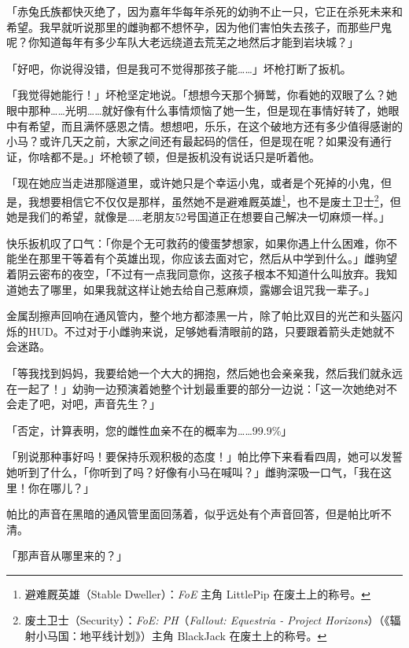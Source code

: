 「赤兔氏族都快灭绝了，因为嘉年华每年杀死的幼驹不止一只，它正在杀死未来和希望。我早就听说那里的雌驹都不想怀孕，因为他们害怕失去孩子，而那些尸鬼呢？你知道每年有多少车队大老远绕道去荒芜之地然后才能到岩块城？」

「好吧，你说得没错，但是我可不觉得那孩子能……」坏枪打断了扳机。

「我觉得她能行！」坏枪坚定地说。「想想今天那个狮鹫，你看她的双眼了么？她眼中那种……光明……就好像有什么事情烦恼了她一生，但是现在事情好转了，她眼中有希望，而且满怀感恩之情。想想吧，乐乐，在这个破地方还有多少值得感谢的小马？或许几天之前，大家之间还有最起码的信任，但是现在呢？如果没有通行证，你啥都不是。」坏枪顿了顿，但是扳机没有说话只是听着他。

「现在她应当走进那隧道里，或许她只是个幸运小鬼，或者是个死掉的小鬼，但是，我想要相信它不仅仅是那样，虽然她不是避难厩英雄\footnote{避难厩英雄（Stable Dweller）：\emph{FoE} 主角 LittlePip 在废土上的称号。}，也不是废土卫士\footnote{废土卫士（Security）：\emph{FoE: PH}（\emph{Fallout: Equestria - Project Horizons}）（《辐射小马国：地平线计划》）主角 BlackJack 在废土上的称号。}，但她是我们的希望，就像是……老朋友52号国道正在想要自己解决一切麻烦一样。」

快乐扳机叹了口气：「你是个无可救药的傻蛋梦想家，如果你遇上什么困难，你不能坐在那里干等着有个英雄出现，你应该去面对它，然后从中学到什么。」雌驹望着阴云密布的夜空，「不过有一点我同意你，这孩子根本不知道什么叫放弃。我知道她去了哪里，如果我就这样让她去给自己惹麻烦，露娜会诅咒我一辈子。」

\horizonline


金属刮擦声回响在通风管内，整个地方都漆黑一片，除了帕比双目的光芒和头盔闪烁的HUD。不过对于小雌驹来说，足够她看清眼前的路，只要跟着箭头走她就不会迷路。

「等我找到妈妈，我要给她一个大大的拥抱，然后她也会亲亲我，然后我们就永远在一起了！」幼驹一边预演着她整个计划最重要的部分一边说：「这一次她绝对不会走了吧，对吧，声音先生？」

「{\mtzh 否定，计算表明，您的雌性血亲不在的概率为……99.9\%}」

「别说那种事好吗！要保持乐观积极的态度！」帕比停下来看看四周，她可以发誓她听到了什么，「你听到了吗？好像有小马在喊叫？」雌驹深吸一口气，「我在这里！你在哪儿？」

帕比的声音在黑暗的通风管里面回荡着，似乎远处有个声音回答，但是帕比听不清。

「那声音从哪里来的？」

